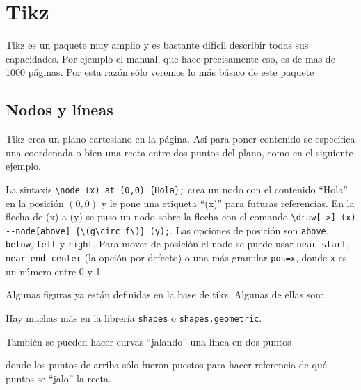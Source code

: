
\chapter{Tikz}
Tikz es un paquete muy amplio y es bastante difícil describir todas sus
capacidades. Por ejemplo el manual, que hace precisamente eso, es de mas de
\num{1000} páginas. Por esta razón sólo veremos lo más básico de este paquete

\section{Nodos y líneas}%
\label{sec:basic}
Tikz crea un plano cartesiano en la página. Así para poner contenido se
específica una coordenada o bien una recta entre dos puntos del plano, como
en el siguiente ejemplo.
\begin{center}
\end{center}
La sintaxis \verb|\node (x) at (0,0) {Hola};| crea un nodo con el contenido
``Hola'' en la posición \((0,0)\) y le pone una etiqueta ``(x)'' para futuras
referencias. En la flecha de (x) a (y) se puso un nodo sobre la flecha con
el comando \verb|\draw[->] (x) --node[above] {\(g\circ f\)} (y);|. Las
opciones de posición son \texttt{above}, \texttt{below}, \texttt{left} y
\texttt{right}. Para mover de posición el nodo se puede usar \texttt{near
start}, \texttt{near end}, \texttt{center} (la opción por defecto) o una más
granular \texttt{pos=x}, donde \texttt{x} es un número entre 0 y 1.

Algunas figuras ya están definidas en la base de tikz. Algunas de ellas son:
\begin{center}
\end{center}
Hay muchas más en la librería \texttt{shapes} o \texttt{shapes.geometric}.

También se pueden hacer curvas ``jalando'' una línea en dos puntos
\begin{center}
\end{center}
donde los puntos de arriba sólo fueron puestos para hacer referencia de qué
puntos se ``jalo'' la recta.

